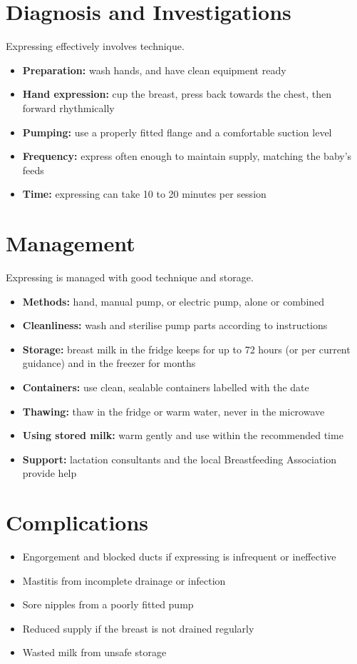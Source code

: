 \section*{Diagnosis and Investigations}
Expressing effectively involves technique.
\begin{itemize}
    \item \textbf{Preparation:} wash hands, and have clean equipment ready
    \item \textbf{Hand expression:} cup the breast, press back towards the chest, then forward rhythmically
    \item \textbf{Pumping:} use a properly fitted flange and a comfortable suction level
    \item \textbf{Frequency:} express often enough to maintain supply, matching the baby's feeds
    \item \textbf{Time:} expressing can take 10 to 20 minutes per session
\end{itemize}

\section*{Management}
Expressing is managed with good technique and storage.
\begin{itemize}
    \item \textbf{Methods:} hand, manual pump, or electric pump, alone or combined
    \item \textbf{Cleanliness:} wash and sterilise pump parts according to instructions
    \item \textbf{Storage:} breast milk in the fridge keeps for up to 72 hours (or per current guidance) and in the freezer for months
    \item \textbf{Containers:} use clean, sealable containers labelled with the date
    \item \textbf{Thawing:} thaw in the fridge or warm water, never in the microwave
    \item \textbf{Using stored milk:} warm gently and use within the recommended time
    \item \textbf{Support:} lactation consultants and the local Breastfeeding Association provide help
\end{itemize}

\section*{Complications}
\begin{itemize}
    \item Engorgement and blocked ducts if expressing is infrequent or ineffective
    \item Mastitis from incomplete drainage or infection
    \item Sore nipples from a poorly fitted pump
    \item Reduced supply if the breast is not drained regularly
    \item Wasted milk from unsafe storage
\end{itemize}

